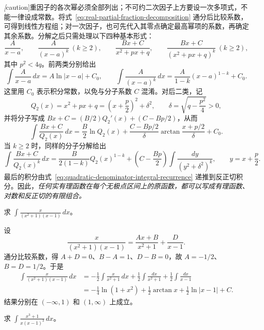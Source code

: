 \documentclass[UTF8,12pt,a4paper,fontset=fandol]{ctexbook}
\begin{document}
\emph[caution]{重因子的各次幂必须全部列出；不可约二次因子上方要设一次多项式，不能一律设成常数。}将式~\eqref{eq:real-partial-fraction-decomposition} 通分后比较系数，可得到线性方程组；对一次因子，也可先代入其零点确定最高幂项的系数，再确定其余系数。分解之后只需处理以下四种基本形式：
\[
    \frac{A}{x-a},\qquad \frac{A}{(x-a)^k}\ (k\geq2),\qquad
    \frac{Bx+C}{x^2+px+q},\qquad
    \frac{Bx+C}{(x^2+px+q)^k}\ (k\geq2),
\]
其中 $p^2<4q$。前两类分别给出
\[
    \int\frac{A}{x-a}\,dx=A\ln|x-a|+C_0,
    \qquad
    \int\frac{A}{(x-a)^k}\,dx
       =\frac{A}{1-k}(x-a)^{1-k}+C_0.
\]
这里用 $C_0$ 表示积分常数，以免与分子系数 $C$ 混淆。对后二类，记
\[
    Q_2(x)=x^2+px+q=\left(x+\frac p2\right)^2+\delta^2,
    \qquad \delta=\sqrt{q-\frac{p^2}4}>0,
\]
并将分子写成 $Bx+C=(B/2)Q_2'(x)+(C-Bp/2)$，从而
\begin{equation}
    \int\frac{Bx+C}{Q_2(x)}\,dx
       =\frac B2\ln Q_2(x)
        +\frac{C-Bp/2}{\delta}\arctan\frac{x+p/2}{\delta}+C_0.
    \label{eq:irreducible-quadratic-linear-numerator-integral}
\end{equation}
当 $k\geq2$ 时，同样的分子分解给出
\[
    \int\frac{Bx+C}{Q_2(x)^k}\,dx
      =\frac{B}{2(1-k)}Q_2(x)^{1-k}
        +\left(C-\frac{Bp}2\right)\int\frac{dy}{(y^2+\delta^2)^k},
    \qquad y=x+\frac p2.
\]
最后的积分由式~\eqref{eq:quadratic-denominator-integral-recurrence} 递推到反正切积分。因此，\emph{任何实有理函数在每个无极点区间上的原函数，都可以写成有理函数、对数和反正切的有限组合。}

\begin{example}
\label{ex:partial-fractions-simple-factors}
求 $\displaystyle\int\frac{x}{(x^2+1)(x-1)}\,dx$。
\end{example}

\begin{solve}
设
\[
    \frac{x}{(x^2+1)(x-1)}=\frac{Ax+B}{x^2+1}+\frac D{x-1}.
\]
通分比较系数，得 $A+D=0$、$B-A=1$、$D-B=0$，故 $A=-1/2$、$B=D=1/2$。于是
\begin{align*}
    \int\frac{x}{(x^2+1)(x-1)}\,dx
      &=-\frac12\int\frac{x}{x^2+1}\,dx
          +\frac12\int\frac{dx}{x^2+1}+\frac12\int\frac{dx}{x-1}\\
      &=-\frac14\ln(1+x^2)+\frac12\arctan x
          +\frac12\ln|x-1|+C.
\end{align*}
结果分别在 $(-\infty,1)$ 和 $(1,\infty)$ 上成立。
\end{solve}

\begin{example}
\label{ex:partial-fractions-repeated-factor}
求 $\displaystyle\int\frac{x^3+1}{x(x-1)^3}\,dx$。
\end{example}
\end{document}
